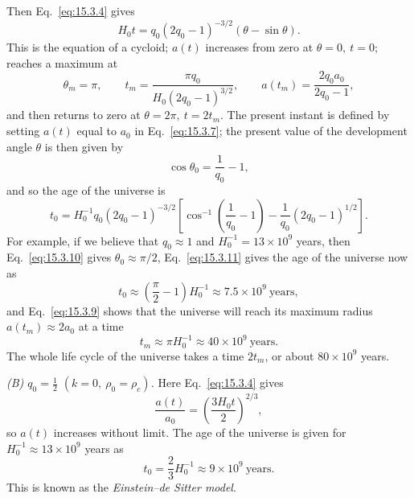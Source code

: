 

Then Eq.~\eqref{eq:15.3.4} gives
\begin{equation}
  H_0t
  =
  q_0(2q_0-1)^{-3/2}(\theta-\sin\theta).
  \tag{15.3.8}\label{eq:15.3.8}
\end{equation}
This is the equation of a cycloid; \(a(t)\) increases from zero at
\(\theta=0,\ t=0\); reaches a maximum at
\begin{equation}
  \theta_m=\pi,\qquad
  t_m=\frac{\pi q_0}{H_0(2q_0-1)^{3/2}},\qquad
  a(t_m)=\frac{2q_0a_0}{2q_0-1},
  \tag{15.3.9}\label{eq:15.3.9}
\end{equation}
and then returns to zero at \(\theta=2\pi,\ t=2t_m\). The present instant
is defined by setting \(a(t)\) equal to \(a_0\) in
Eq.~\eqref{eq:15.3.7}; the present value of the development angle
\(\theta\) is then given by
\begin{equation}
  \cos\theta_0=\frac1{q_0}-1,
  \tag{15.3.10}\label{eq:15.3.10}
\end{equation}
and so the age of the universe is
\begin{equation}
  t_0
  =
  H_0^{-1}q_0(2q_0-1)^{-3/2}
  \left[
    \cos^{-1}\left(\frac1{q_0}-1\right)
    -\frac1{q_0}(2q_0-1)^{1/2}
  \right].
  \tag{15.3.11}\label{eq:15.3.11}
\end{equation}
For example, if we believe that \(q_0\approx1\) and
\(H_0^{-1}=13\times10^9\) years, then Eq.~\eqref{eq:15.3.10} gives
\(\theta_0\approx\pi/2\), Eq.~\eqref{eq:15.3.11} gives the age of the
universe now as
\begin{equation}
  t_0
  \approx
  \left(\frac{\pi}{2}-1\right)H_0^{-1}
  \approx7.5\times10^9\ \text{years},
  \tag{15.3.12}\label{eq:15.3.12}
\end{equation}
and Eq.~\eqref{eq:15.3.9} shows that the universe will reach its maximum
radius \(a(t_m)\approx2a_0\) at a time
\begin{equation}
  t_m\approx\pi H_0^{-1}\approx40\times10^9\ \text{years}.
  \tag{15.3.13}\label{eq:15.3.13}
\end{equation}
The whole life cycle of the universe takes a time \(2t_m\), or about
\(80\times10^9\) years.

\emph{(B) \(q_0=\tfrac12\)
\((k=0,\ \rho_0=\rho_c)\).} Here Eq.~\eqref{eq:15.3.4} gives
\begin{equation}
  \frac{a(t)}{a_0}
  =
  \left(\frac{3H_0t}{2}\right)^{2/3},
  \tag{15.3.14}\label{eq:15.3.14}
\end{equation}
so \(a(t)\) increases without limit. The age of the universe is given for
\(H_0^{-1}\approx13\times10^9\) years as
\begin{equation}
  t_0=\frac23H_0^{-1}\approx9\times10^9\ \text{years}.
  \tag{15.3.15}\label{eq:15.3.15}
\end{equation}
This is known as the \emph{Einstein--de Sitter model}.

